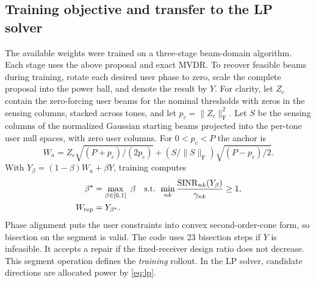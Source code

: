 \documentclass[journal]{IEEEtran}
\newcommand{\F}{_{\mathrm F}}
\newcommand{\sn}{\operatorname{SINR}}
\newcommand{\norm}[1]{\lVert #1\rVert}
\begin{document}
\subsection{Training objective and transfer to the LP solver}
The available weights were trained on a three-stage beam-domain algorithm. Each stage uses the above proposal and exact MVDR. To recover feasible beams during training, rotate each desired user phase to zero, scale the complete proposal into the power ball, and denote the result by $Y$. For clarity, let $Z_c$ contain the zero-forcing user beams for the nominal thresholds with zeros in the sensing columns, stacked across tones, and let $p_c=\norm{Z_c}\F^2$. Let $S$ be the sensing columns of the normalized Gaussian starting beams projected into the per-tone user null spaces, with zero user columns. For $0<p_c<P$ the anchor is
\begin{equation}
 W_a=Z_c\sqrt{(P+p_c)/(2p_c)}
      +(S/\norm{S}\F)\sqrt{(P-p_c)/2}.
\end{equation}
With $Y_\beta=(1-\beta)W_a+\beta Y$, training computes
\begin{align}
 \beta^\star&=\max_{\beta\in[0,1]}\ \beta
 \quad\text{s.t. }\min_{nk}\frac{\sn_{nk}(Y_\beta)}{\gamma_{nk}}\ge1,\\
 W_{\rm rep}&=Y_{\beta^\star}.
\end{align}
Phase alignment puts the user constraints into convex second-order-cone form, so bisection on the segment is valid. The code uses 23 bisection steps if $Y$ is infeasible. It accepts a repair if the fixed-receiver design ratio does not decrease. This segment operation defines the \emph{training} rollout. In the LP solver, candidate directions are allocated power by \eqref{eq:lp}.
\end{document}
